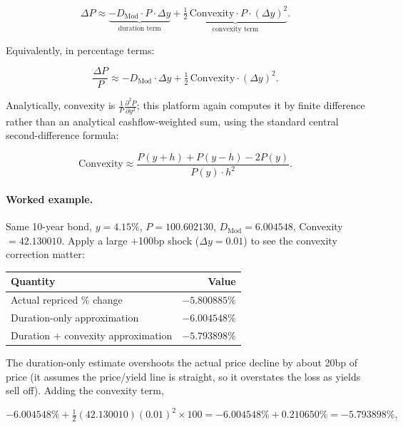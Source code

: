 \documentclass[11pt]{article}
\begin{document}
\begin{equation}
  \Delta P \approx \underbrace{-D_{\text{Mod}} \cdot P \cdot \Delta y}_{\text{duration term}}
                  + \underbrace{\tfrac{1}{2}\, \text{Convexity} \cdot P \cdot (\Delta y)^2}_{\text{convexity term}}.
  \label{eq:taylor-price}
\end{equation}

Equivalently, in percentage terms:

\begin{equation}
  \frac{\Delta P}{P} \approx -D_{\text{Mod}} \cdot \Delta y + \tfrac{1}{2}\,\text{Convexity}\cdot (\Delta y)^2.
  \label{eq:taylor-pct}
\end{equation}

Analytically, convexity is $\frac{1}{P}\frac{\partial^2 P}{\partial y^2}$; this platform again
computes it by finite difference rather than an analytical cashflow-weighted sum, using the
standard central second-difference formula:

\begin{equation}
  \text{Convexity} \approx \frac{P(y+h) + P(y-h) - 2P(y)}{P(y)\cdot h^2}.
  \label{eq:convexity-fd}
\end{equation}

\paragraph{Worked example.} Same 10-year bond, $y = 4.15\%$, $P = 100.602130$,
$D_{\text{Mod}} = 6.004548$, Convexity $= 42.130010$. Apply a large +100bp shock
($\Delta y = 0.01$) to see the convexity correction matter:

\begin{center}
\begin{tabular}{@{}lr@{}}
\toprule
Quantity & Value \\
\midrule
Actual repriced \% change            & $-5.800885\%$ \\
Duration-only approximation          & $-6.004548\%$ \\
Duration + convexity approximation   & $-5.793898\%$ \\
\bottomrule
\end{tabular}
\end{center}

The duration-only estimate overshoots the actual price decline by about 20bp of price (it
assumes the price/yield line is straight, so it overstates the loss as yields sell off). Adding
the convexity term,

\[
  -6.004548\% + \tfrac{1}{2}(42.130010)(0.01)^2 \times 100 = -6.004548\% + 0.210650\% = -5.793898\%,
\]
\end{document}

